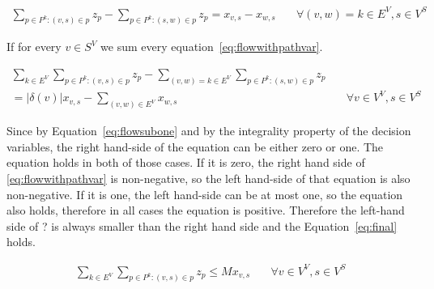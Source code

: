 \documentclass{article}
\begin{document}
\begin{align}
  \sum\limits_{p \in P^k : (v,s) \in p} z_{p}
    - \sum\limits_{p \in P^k : (s,w) \in p} z_{p} 
    = x_{v,s} - x_{w,s}   
    & \quad \forall (v,w) = k \in E^{V}, s \in V^{S} \label{eq:flowwithpathvar}
\end{align}

If for every $v \in S^V$ we sum every equation~\ref{eq:flowwithpathvar}.

\begin{align}
  \sum\limits_{k \in E^{V}}\sum\limits_{p \in P^k : (v,s) \in p} z_{p}
    - \sum\limits_{(v,w) = k \in E^V}\sum\limits_{p \in P^k : (s,w) \in p} z_{p} & \nonumber \\
    = |\delta(v)| x_{v,s} - \sum\limits_{(v,w) \in E^{V}} x_{w,s}       & \quad \forall v \in V^{V}, s \in V^{S}
\end{align}

Since by Equation~\ref{eq:flowsubone} and by the integrality property of the decision variables, the right
hand-side of the equation can be either zero or one. The equation holds in both of those cases.
If it is zero, the right hand side of \eqref{eq:flowwithpathvar} is non-negative, so
the left hand-side of that equation is also non-negative. If it is one, the left hand-side
can be at most one, so the equation also holds, therefore in all cases the equation is positive.
Therefore the left-hand side of ? is always smaller than the right hand side and the 
Equation~\eqref{eq:final} holds.


\begin{comment}
\begin{align}
    \sum\limits_{(v,w) \in E^{V}} x_{w,s} -
    \sum\limits_{(v,w) = k \in E^{V}}\sum\limits_{p \in P^k : (s,w) \in p} z_{p} \geq 0 & \quad \forall v \in V^{V}, s \in V^{S} \\
    \sum\limits_{(v,w) = k \in E^{V}}\sum\limits_{p \in P^k : (s,w) \in p} z_{p} \leq \sum\limits_{(v,w) \in E^{V}} x_{w,s} & \quad \forall v \in V^{V}, s \in V^{S} 
\end{align}
\end{comment}

\begin{align}
  \sum\limits_{k \in E^{V}}\sum\limits_{p \in P^k : (v,s) \in p} z_{p} \leq M x_{v,s}       & \quad \forall v \in V^{V}, s \in V^{S}
  \label{eq:final}
\end{align}

\end{document}
